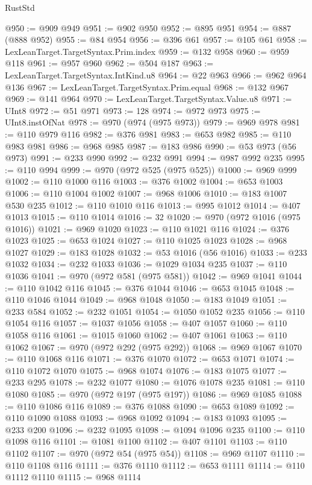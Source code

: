 \begin{lexlean}{RustStd}
\begin{coremodule}
{\begin{coremodule}
{{{{{{{{{{{{{{{{{{{{{{{{{{{{{{{{{{{{{{{{{{{{{{{@950 := @909 @949
@951 := @902 @950
@952 := @895 @951
@954 := @887 (@888 @952)
@955 := @84 @954
@956 := @396 @61
@957 := @105 @61
@958 := LexLeanTarget.TargetSyntax.Prim.index
@959 := @132 @958
@960 := @959 @118
@961 := @957 @960
@962 := @504 @187
@963 := LexLeanTarget.TargetSyntax.IntKind.u8
@964 := @22 @963
@966 := @962 @964 @136
@967 := LexLeanTarget.TargetSyntax.Prim.equal
@968 := @132 @967
@969 := @141 @964
@970 := LexLeanTarget.TargetSyntax.Value.u8
@971 := UInt8
@972 := @51 @971
@973 := 128
@974 := @972 @973
@975 := UInt8.instOfNat
@978 := @970 (@974 (@975 @973))
@979 := @969 @978
@981 := @110 @979 @116
@982 := @376 @981
@983 := @653 @982
@985 := @110 @983 @981
@986 := @968 @985
@987 := @183 @986
@990 := @53 @973 (@56 @973)
@991 := @233 @990
@992 := @232 @991
@994 := @987 @992 @235
@995 := @110 @994
@999 := @970 (@972 @525 (@975 @525))
@1000 := @969 @999
@1002 := @110 @1000 @116
@1003 := @376 @1002
@1004 := @653 @1003
@1006 := @110 @1004 @1002
@1007 := @968 @1006
@1010 := @183 @1007 @530 @235
@1012 := @110 @1010 @116
@1013 := @995 @1012
@1014 := @407 @1013
@1015 := @110 @1014
@1016 := 32
@1020 := @970 (@972 @1016 (@975 @1016))
@1021 := @969 @1020
@1023 := @110 @1021 @116
@1024 := @376 @1023
@1025 := @653 @1024
@1027 := @110 @1025 @1023
@1028 := @968 @1027
@1029 := @183 @1028
@1032 := @53 @1016 (@56 @1016)
@1033 := @233 @1032
@1034 := @232 @1033
@1036 := @1029 @1034 @235
@1037 := @110 @1036
@1041 := @970 (@972 @581 (@975 @581))
@1042 := @969 @1041
@1044 := @110 @1042 @116
@1045 := @376 @1044
@1046 := @653 @1045
@1048 := @110 @1046 @1044
@1049 := @968 @1048
@1050 := @183 @1049
@1051 := @233 @584
@1052 := @232 @1051
@1054 := @1050 @1052 @235
@1056 := @110 @1054 @116
@1057 := @1037 @1056
@1058 := @407 @1057
@1060 := @110 @1058 @116
@1061 := @1015 @1060
@1062 := @407 @1061
@1063 := @110 @1062
@1067 := @970 (@972 @292 (@975 @292))
@1068 := @969 @1067
@1070 := @110 @1068 @116
@1071 := @376 @1070
@1072 := @653 @1071
@1074 := @110 @1072 @1070
@1075 := @968 @1074
@1076 := @183 @1075
@1077 := @233 @295
@1078 := @232 @1077
@1080 := @1076 @1078 @235
@1081 := @110 @1080
@1085 := @970 (@972 @197 (@975 @197))
@1086 := @969 @1085
@1088 := @110 @1086 @116
@1089 := @376 @1088
@1090 := @653 @1089
@1092 := @110 @1090 @1088
@1093 := @968 @1092
@1094 := @183 @1093
@1095 := @233 @200
@1096 := @232 @1095
@1098 := @1094 @1096 @235
@1100 := @110 @1098 @116
@1101 := @1081 @1100
@1102 := @407 @1101
@1103 := @110 @1102
@1107 := @970 (@972 @54 (@975 @54))
@1108 := @969 @1107
@1110 := @110 @1108 @116
@1111 := @376 @1110
@1112 := @653 @1111
@1114 := @110 @1112 @1110
@1115 := @968 @1114
}}}}}}}}}}}}}}}}}}}}}}}}}}}}}}}}}}}}}}}}}}}}}}}
\end{coremodule}}
\end{coremodule}
\end{lexlean}
